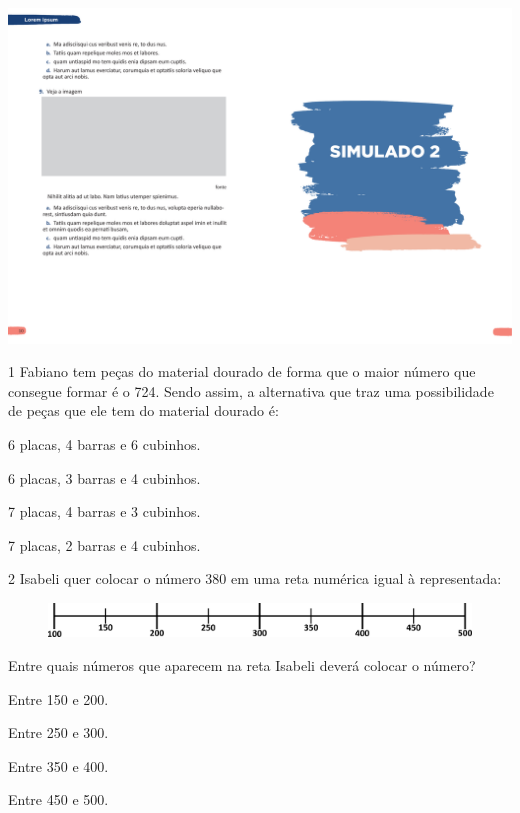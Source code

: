 \vspace*{-3.4cm}
\hspace*{-3.7cm}\includegraphics[scale=1]{../watermarks/2simulado5ano.pdf}

\num{1} Fabiano tem peças do material dourado de forma que o maior número
que consegue formar é o 724. Sendo assim, a alternativa que traz uma
possibilidade de peças que ele tem do material dourado é:

\begin{escolha}
\item
  6 placas, 4 barras e 6 cubinhos.
\item
  6 placas, 3 barras e 4 cubinhos.
\item
  7 placas, 4 barras e 3 cubinhos.
\item
  7 placas, 2 barras e 4 cubinhos.
\end{escolha}

\num{2} Isabeli quer colocar o número 380 em uma reta numérica igual à representada:

\begin{figure}[htpb!]
\centering
\includegraphics[width=\textwidth]{./media/image102.png}
\end{figure}

Entre quais números que aparecem na reta Isabeli deverá colocar o número?

\begin{escolha}
\item
  Entre 150 e 200.
\item
  Entre 250 e 300.
\item
  Entre 350 e 400.
\item
  Entre 450 e 500.
\end{escolha}

